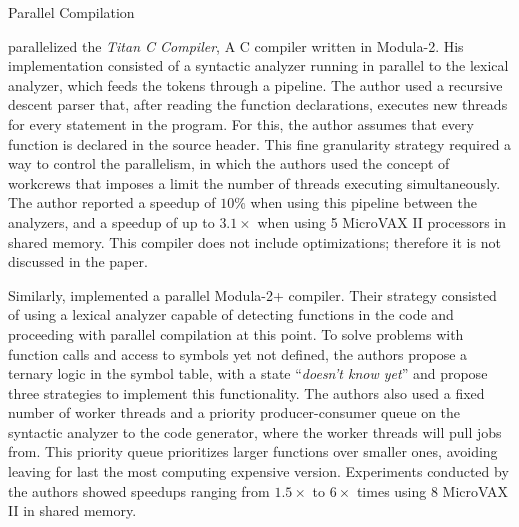 \begin{section}{Parallel Compilation}

 \cite{vandevoorde1988parallel} parallelized the \textit{Titan C Compiler}, A C
 compiler written in Modula-2. His implementation consisted of a syntactic
 analyzer running in parallel to the lexical analyzer, which feeds the tokens
 through a pipeline. The author used a recursive descent parser that, after
 reading the function declarations, executes new threads for every statement in
 the program. For this, the author assumes that every function is declared in
 the source header. This fine granularity strategy required a way to control
 the parallelism, in which the authors used the concept of workcrews that imposes a limit
 the number of threads executing simultaneously. The author reported a speedup
 of $10\%$ when using this pipeline between the analyzers, and a speedup of up
 to $3.1\times$ when using 5 MicroVAX II processors in shared memory. This
 compiler does not include optimizations; therefore it is not discussed in
 the paper.



Similarly, \cite{wortman1992} implemented a parallel Modula-2+ compiler. Their
strategy consisted of using a lexical analyzer capable of detecting functions
in the code and proceeding with parallel compilation at this point. To solve
problems with function calls and access to symbols yet not defined, the authors
propose a ternary logic in the symbol table, with a state ``\textit{doesn't
know yet}'' and propose three strategies to implement this functionality. The
authors also used a fixed number of worker threads and a priority
producer-consumer queue on the syntactic analyzer to the code generator, where
the worker threads will pull jobs from. This priority queue prioritizes larger
functions over smaller ones, avoiding leaving for last the most computing
expensive version. Experiments conducted by the authors showed speedups ranging
from $1.5\times$ to $6\times$ times using 8 MicroVAX II in shared memory.


\end{section}
